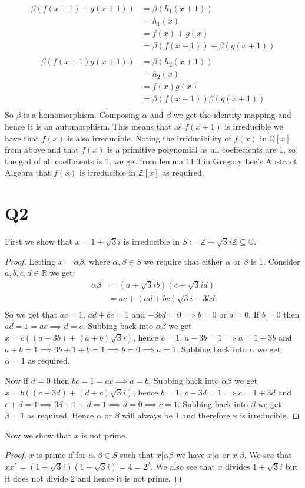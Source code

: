 \documentclass{article}
\theoremstyle{definition}
\begin{document}
\begin{align*}
\beta(f(x+1)+g(x+1))&=\beta(h_1(x+1))\\
&=h_1(x)\\
&=f(x)+g(x)\\
&=\beta(f(x+1))+\beta(g(x+1))\\
\end{align*}
\begin{align*}
\beta(f(x+1)g(x+1))&=\beta(h_2(x+1))\\
&=h_2(x)\\
&=f(x)g(x)\\
&=\beta(f(x+1))\beta(g(x+1))\\
\end{align*}
So $\beta$ is a homomorphism. Composing $\alpha$ and $\beta$ we get the identity mapping and hence it is an automorphism. This means that as $f(x+1)$ is irreducible we have that $f(x)$ is also irreducible. Noting the irriducibility of $f(x)$ in $\mathbb{Q}[x]$ from above and that $f(x)$ is a primitive polynomial as all coeffecients are 1, so the gcd of all coefficients is 1, we get from lemma 11.3 in Gregory Lee's Abstract Algebra that $f(x)$ is irreducible in $\mathbb{Z}[x]$ as required.
\section*{Q2}
First we show that $x=1+\sqrt{3}i$ is irreducible in $S:=\mathbb{Z}+\sqrt{3}i\mathbb{Z}\subseteq\mathbb{C}$.
\begin{proof}
Letting $x=\alpha\beta$, where $\alpha,\beta\in S$ we require that either $\alpha$ or $\beta$ is 1. Consider $a,b,c,d\in\mathbb{R}$ we get:
\begin{align*}
\alpha\beta&=(a+\sqrt{3}ib)(c+\sqrt{3}id)\\
&=ac+(ad+bc)\sqrt{3}i-3bd\\
\end{align*}
So we get that $ac=1$, $ad+bc=1$ and $-3bd=0\implies b=0$ or $d=0$. If $b=0$ then $ad=1=ac\implies d=c$. Subbing back into $\alpha\beta$ we get $x=c((a-3b)+(a+b)\sqrt{3}i)$, hence $c=1$, $a-3b=1\implies a=1+3b$ and $a+b=1\implies3b+1+b=1\implies b=0\implies a=1$. Subbing back into $\alpha$ we get $\alpha=1$ as required.

Now if $d=0$ then $bc=1=ac\implies a=b$. Subbing back into $\alpha\beta$ we get $x=b((c-3d)+(d+c)\sqrt{3}i)$, hence $b=1$, $c-3d=1\implies c=1+3d$ and $c+d=1\implies 3d+1+d=1\implies d=0\implies c=1$. Subbing back into $\beta$ we get $\beta=1$ as required. Hence $\alpha$ or $\beta$ will always be 1 and therefore x is irreducible. 
\end{proof}
\noindent Now we show that $x$ is not prime.
\begin{proof}
$x$ is prime if for $\alpha,\beta\in S$ such that $x|\alpha\beta$ we have $x | \alpha$ or $x | \beta$. We see that $xx^{*}=(1+\sqrt{3}i)(1-\sqrt{3}i)=4=2^2$. We also see that $x$ divides $1+\sqrt{3}i$ but it does not divide 2 and hence it is not prime.
\end{proof}
\end{document}
